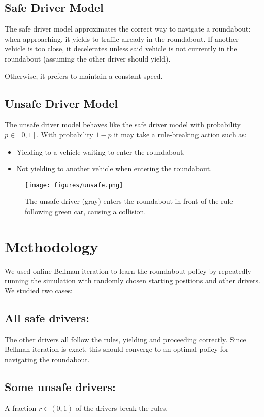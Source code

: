 \documentclass[conference]{IEEEtran}
\begin{document}
\subsection*{Safe Driver Model} The safe driver model approximates the correct way to navigate a roundabout: when approaching, it yields to traffic already in the roundabout. If another vehicle is too close, it decelerates unless said vehicle is not currently in the roundabout (assuming the other driver should yield).

Otherwise, it prefers to maintain a constant speed.
\subsection*{Unsafe Driver Model}
The unsafe driver model behaves like the safe driver model with probability $p \in [0,1]$. With probability $1-p$ it may take a rule-breaking action such as:
\begin{itemize}
	\item Yielding to a vehicle waiting to enter the roundabout.
	\item Not yielding to another vehicle when entering the roundabout.
\end{itemize}
\begin{figure}[h]
	\centering
\texttt{[image: figures/unsafe.png]}
\caption{The unsafe driver (gray) enters the roundabout in front of the rule-following green car, causing a collision.}
\label{fig:unsafe}
\end{figure}

\section{Methodology}
We used online Bellman iteration to learn the roundabout policy by repeatedly running the simulation with randomly chosen starting positions and other drivers.
We studied two cases:

\subsection*{All safe drivers:} The other drivers all follow the rules, yielding and proceeding correctly. Since Bellman iteration is exact, this should converge to an optimal policy for navigating the roundabout.

\subsection*{Some unsafe drivers:} A fraction $r\in (0,1)$ of the drivers break the rules.
\end{document}
